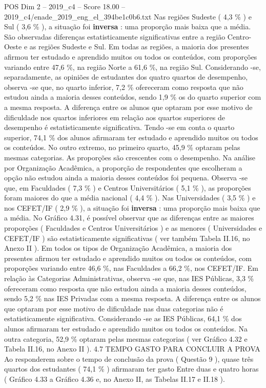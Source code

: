 \begin{textsample}{POS Dim 2 – 2019\_c4 – Score 18.00 – 2019\_c4/enade\_2019\_eng\_el\_394be1c0b6.txt}
Nas regiões Sudeste ( 4,3 \% ) e Sul ( 3,6 \% ), a situação foi \textbf{inversa} : uma proporção mais baixa que a média.
São observadas diferenças estatisticamente significativas entre a região Centro-Oeste e as regiões Sudeste e Sul.
Em todas as regiões, a maioria dos presentes afirmou ter estudado e aprendido muitos ou todos os conteúdos, com proporções variando entre 47,6 \%, na região Norte a 61,6 \%, na região Sul.
Considerando -se, separadamente, as opiniões de estudantes dos quatro quartos de desempenho, observa -se que, no quarto inferior, 7,2 \% ofereceram como resposta que não estudou ainda a maioria desses conteúdos, sendo 1,9 \% os do quarto superior com a mesma resposta.
A diferença entre os alunos que optaram por esse motivo de dificuldade nos quartos inferiores em relação aos quartos superiores de desempenho é estatisticamente significativa.
Tendo -se em conta o quarto superior, 74,1 \% dos alunos afirmaram ter estudado e aprendido muitos ou todos os conteúdos.
No outro extremo, no primeiro quarto, 45,9 \% optaram pelas mesmas categorias.
As proporções são crescentes com o desempenho.
Na análise por Organização Acadêmica, a proporção de respondentes que escolheram a opção não estudou ainda a maioria desses conteúdos foi pequena.
Observa -se que, em Faculdades ( 7,3 \% ) e Centros Universitários ( 5,1 \% ), as proporções foram maiores do que a média nacional ( 4,4 \% ).
Nas Universidades ( 3,5 \% ) e nos CEFET/IF ( 2,9 \% ), a situação foi \textbf{inversa} : uma proporção mais baixa que a média.
No Gráfico 4.31, é possível observar que as diferenças entre as maiores proporções ( Faculdades e Centros Universitários ) e as menores ( Universidades e CEFET/IF ) são estatisticamente significativas ( ver também Tabela II.16, no Anexo II ).
Em todos os tipos de Organização Acadêmica, a maioria dos presentes afirmou ter estudado e aprendido muitos ou todos os conteúdos, com proporções variando entre 46,6 \%, nas Faculdades a 66,2 \%, nos CEFET/IF.
Em relação às Categorias Administrativas, observa -se que, nas IES Públicas, 3,3 \% ofereceram como resposta que não estudou ainda a maioria desses conteúdos, sendo 5,2 \% nas IES Privadas com a mesma resposta.
A diferença entre os alunos que optaram por esse motivo de dificuldade nas duas categorias não é estatisticamente significativa.
Considerando -se as IES Públicas, 64,1 \% dos alunos afirmaram ter estudado e aprendido muitos ou todos os conteúdos.
Na outra categoria, 52,9 \% optaram pelas mesmas categorias ( ver Gráfico 4.32 e Tabela II.16, no Anexo II ). 4.7 TEMPO GASTO PARA CONCLUIR A PROVA Ao responderem sobre o tempo de conclusão da prova ( Questão 9 ), quase três quartos dos estudantes ( 74,1 \% ) afirmaram ter gasto Entre duas e quatro horas ( Gráfico 4.33 a Gráfico 4.36 e, no Anexo II, as Tabelas II.17 e II.18 ).

\end{textsample}
